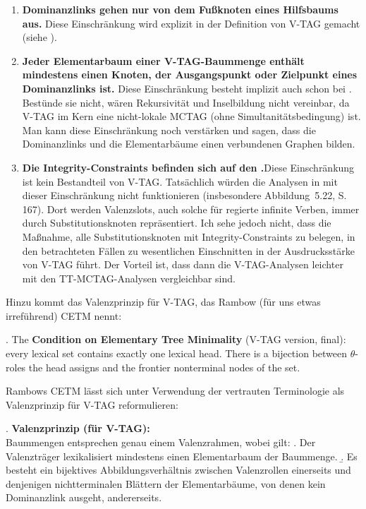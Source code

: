 \begin{enumerate}
  \item {\bf Dominanzlinks gehen nur von dem Fu\ss knoten eines Hilfsbaums aus.} Diese Einschränkung wird explizit in der Definition von V-TAG gemacht (siehe \citealt[Def.~21]{Rambow:94}).
  \item  {\bf Jeder Elementarbaum einer V-TAG-Baummenge enthält mindestens einen Knoten, der Ausgangspunkt oder Zielpunkt eines Dominanzlinks ist.} Diese Einschränkung besteht implizit auch schon bei \cite{Rambow:94}. Bestünde sie nicht, wären  Rekursivität und Inselbildung nicht vereinbar, da V-TAG im Kern eine nicht-lokale MCTAG (ohne Simultanitätsbedingung) ist. Man kann diese Einschränkung noch verstärken und sagen, dass die Dominanzlinks und die Elementarbäume einen verbundenen Graphen bilden.  
  \item {\bf Die Integrity-Constraints befinden sich auf den .}\linebreak Diese Einschränkung ist kein Bestandteil von V-TAG. Tatsächlich würden die Analysen in \cite{Rambow:94} mit dieser Einschränkung nicht funktionieren (insbesondere Abbildung~5.22, S.\,167). Dort werden Valenzslots, auch solche für regierte infinite Verben, immer durch Substitutionsknoten repräsentiert. Ich sehe jedoch nicht, dass die Maßnahme, alle Substitutionsknoten mit Integrity-Constraints zu belegen, in den betrachteten Fällen zu wesentlichen Einschnitten in der Ausdrucksstärke von V-TAG führt. Der Vorteil ist, dass dann die V-TAG-Analysen leichter mit den TT-MCTAG-Analysen vergleichbar sind. 
\end{enumerate}     
Hinzu kommt das Valenzprinzip für V-TAG, das Rambow (für uns etwas irreführend) CETM nennt:    

\ex. The {\bf Condition on Elementary Tree Minimality} (V-TAG version, final): every lexical set contains exactly one lexical head. There is a bijection between $\theta$-roles the head assigns and the frontier nonterminal nodes of the set. \hfill
\citep[149]{Rambow:94} \label{ex-vtag-cetm}

Rambows CETM lässt sich unter Verwendung der vertrauten Terminologie als Valenzprinzip für V-TAG reformulieren:

\ex. {\bf Valenzprinzip (für V-TAG):} \label{ex-vtag-valenz}\\
Baummengen entsprechen genau einem Valenzrahmen, wobei gilt:
\a. Der Valenzträger lexikalisiert mindestens einen Elementarbaum der Baummenge.
\b. Es besteht ein bijektives Abbildungsverhältnis zwischen Valenzrollen einerseits und denjenigen nichtterminalen Blättern der Elementarbäume, von denen kein Dominanzlink ausgeht, andererseits.

